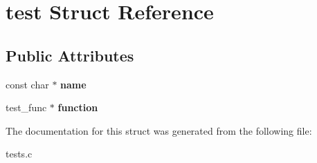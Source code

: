 \hypertarget{structtest}{}\section{test Struct Reference}
\label{structtest}
\subsection*{Public Attributes}
\begin{DoxyCompactItemize}
\item 
const char $\ast$ {\bfseries name}\hypertarget{structtest_a0abb922edf6449c8fe5dd6fd3b684f7f}{}\label{structtest_a0abb922edf6449c8fe5dd6fd3b684f7f}

\item 
test\+\_\+func $\ast$ {\bfseries function}\hypertarget{structtest_ad080f673e0517413592faef93d9e1521}{}\label{structtest_ad080f673e0517413592faef93d9e1521}

\end{DoxyCompactItemize}


The documentation for this struct was generated from the following file\+:\begin{DoxyCompactItemize}
\item 
tests.\+c\end{DoxyCompactItemize}
